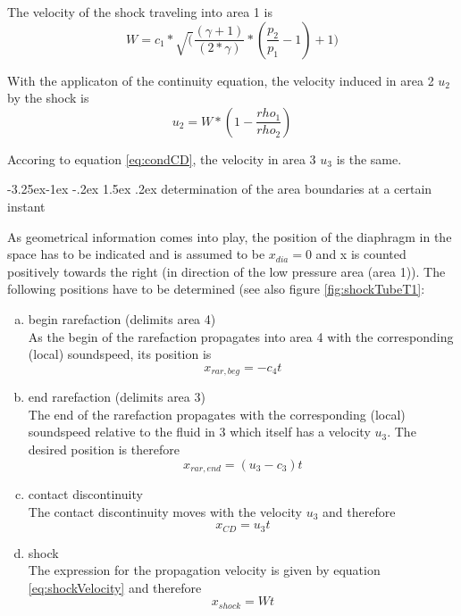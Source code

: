 \documentclass{report}
\makeatletter
\renewcommand\paragraph{\@startsection{paragraph}{4}{\z@}%
  {-3.25ex\@plus -1ex \@minus -.2ex}%
  {1.5ex \@plus .2ex}%
  {\normalfont\normalsize\bfseries}}
\makeatother
\begin{document}
The velocity of the shock traveling into area 1 is
\begin{equation}
\label{eq:shockVelocity}
W=c_1*\sqrt(\frac{(\gamma+1)}{(2*\gamma)}*(\frac{p_2}{p_1}-1)+1)
\end{equation}

With the applicaton of the continuity equation, the velocity induced in area 2 $u_2$ by the shock is
\begin{equation}
 u_2=W*(1-\frac{rho_1}{rho_2})
\end{equation}

Accoring to equation \ref{eq:condCD}, the velocity in area 3 $u_3$ is the same.

\paragraph{determination of the area boundaries at a certain instant}

As geometrical information comes into play, the position of the diaphragm in the space has to be indicated and is assumed to be $x_{dia}=0$ and x is counted positively towards the right (in direction of the low pressure area (area 1)).
The following positions have to be determined (see also figure \ref{fig:shockTubeT1}:

\begin{enumerate} [(a)]

  \item begin rarefaction (delimits area 4) \\
As the begin of the rarefaction propagates into area 4 with the corresponding (local) soundspeed, its position is 
\begin{equation}
 x_{rar,beg}=-c_4 t
\end{equation}

  \item end rarefaction (delimits area 3) \\
The end of the rarefaction propagates with the corresponding (local) soundspeed relative to the fluid in 3 which itself has a velocity $u_3$. The desired position is therefore
\begin{equation}
 x_{rar,end}=(u_3-c_3) t
\end{equation}

  \item contact discontinuity \\
The contact discontinuity moves with the velocity $u_3$ and therefore
\begin{equation}
 x_{CD}=u_3 t
\end{equation}

  \item shock \\
  The expression for the propagation velocity is given by equation \ref{eq:shockVelocity} and therefore
\begin{equation}
 x_{shock}=W t
\end{equation}

\end{enumerate}
\end{document}

